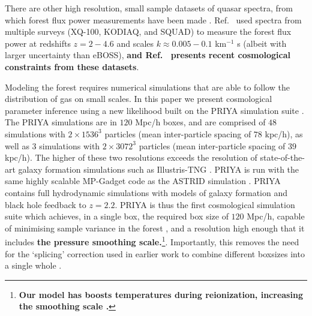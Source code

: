 There are other high resolution, small sample datasets of quasar spectra, from which \lya forest flux power measurements have been made \cite{2017MNRAS.466.4332I, 2019MNRAS.489.2536D, 2022MNRAS.509.2842K, 2022MNRAS.515..857E}. Ref.~\cite{2022MNRAS.509.2842K} used spectra from multiple surveys (XQ-100, KODIAQ, and SQUAD) to measure the \lya forest flux power at redshifts $z=2-4.6$ and scales $k\approx0.005-0.1$ km$^{-1}$ s (albeit with larger uncertainty than eBOSS), \textbf{and Ref.~\cite{2022MNRAS.515..857E} presents recent cosmological constraints from these datasets}.

Modeling the \lya forest requires numerical simulations that are able to follow the distribution of gas on small scales.
In this paper we present cosmological parameter inference using a new likelihood built on the PRIYA simulation suite \cite{2023simsuite}.
The PRIYA simulations are in $120$ Mpc/h boxes, and are comprised of $48$ simulations with $2\times 1536^3$ particles (mean inter-particle spacing of $78$ kpc/h), as well as $3$ simulations with $2\times 3072^3$ particles (mean inter-particle spacing of $39$ kpc/h).
The higher of these two resolutions exceeds the resolution of state-of-the-art galaxy formation simulations such as Illustris-TNG \cite{2018MNRAS.475..676S}.
PRIYA is run with the same highly scalable MP-Gadget code as the ASTRID simulation \cite{2022MNRAS.512.3703B,2022MNRAS.513..670N}.
PRIYA contains full hydrodynamic simulations with models of galaxy formation and black hole feedback to $z=2.2$.
PRIYA is thus the first cosmological simulation suite which achieves, in a single box, the required box size of $120$ Mpc/h, capable of minimising sample variance in the \lya forest \cite{2014JCAP...07..005B}, and a resolution high enough that it includes \textbf{the pressure smoothing scale.}\footnote{\textbf{Our model has boosts temperatures during reionization, increasing the smoothing scale \cite{2023simsuite}.}}.
Importantly, this removes the need for the `splicing' correction used in earlier work to combine different boxsizes into a single whole \cite{2014JCAP...07..005B,2020JCAP...04..038P}.

